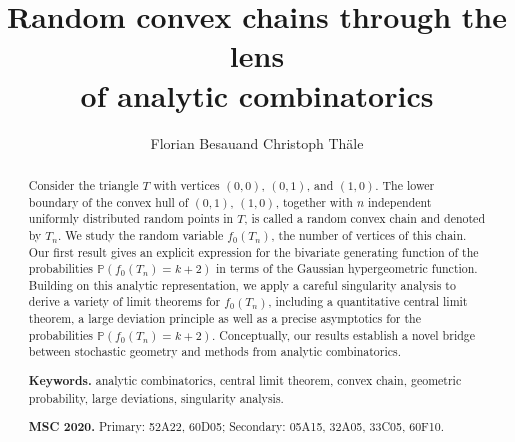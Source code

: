 \documentclass[11pt,a4paper]{article}
\numberwithin{equation}{section}
\begin{document}
\title{\bfseries Random convex chains through the lens\\ of analytic combinatorics}

\author{Florian Besau\footnotemark[1]\;\;\;and Christoph Th\"ale\footnotemark[2]}

\renewcommand{\thefootnote}{\fnsymbol{footnote}}


\date{}

\maketitle

\begin{abstract}
Consider the triangle $T$ with vertices $(0,0)$, $(0,1)$, and $(1,0)$. 
The lower boundary of the convex hull of $(0,1)$, $(1,0)$, together with $n$ independent uniformly distributed random points in $T$, is called a random convex chain and denoted by $T_n$. We study the random variable $f_0(T_n)$, the number of vertices of this chain. Our first result gives an explicit expression for the bivariate generating function of the probabilities $\mathbb{P}(f_0(T_n)=k+2)$ in terms of the Gaussian hypergeometric function. 
Building on this analytic representation, we apply a careful singularity analysis to derive a variety of limit theorems for $f_0(T_n)$, including a quantitative central limit theorem, a large deviation principle as well as a precise asymptotics for the probabilities $\mathbb{P}(f_0(T_n)=k+2)$. Conceptually, our results establish a novel bridge between stochastic geometry and methods from analytic combinatorics.

  \smallskip\noindent
  \textbf{Keywords.} analytic combinatorics, central limit theorem, convex chain, geometric probability, large deviations, singularity analysis.
  
  \smallskip\noindent
  \textbf{MSC 2020.} Primary:
  52A22, %
  60D05; %
  Secondary:
  05A15, %
  32A05, %
  33C05, %
  60F10. %
\end{abstract}
\end{document}
